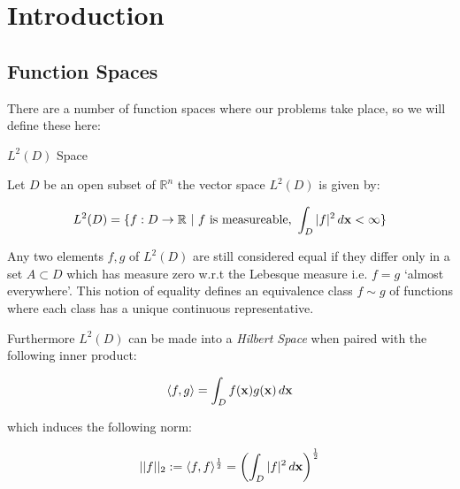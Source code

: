 \chapter{Introduction}


\section{Function Spaces}

There are a number of function spaces where our problems take place, so we will
define these here:

\begin{definition}\label{def:L2-D}
    $L^2(D)$ Space

    Let $D$ be an open subset of $\mathbb{R}^n$ the vector space $L^2(D)$ is
    given by:

    \begin{equation}\label{eq:L2-D}
        L^2(D) = \{f: D \rightarrow \mathbb{R}\ |\ f \text{ is measureable, }
                    \int_D|f|^2\, d\mathbf{x} < \infty\}
    \end{equation}

    Any two elements $f,g$ of $L^2(D)$ are still considered equal if they
    differ only in a set $A \subset D$ which has measure zero w.r.t the
    Lebesque measure i.e. $f = g$ `almost everywhere'. This notion of equality
    defines an equivalence class $f \sim g$ of functions where each class has a
    unique continuous representative.

    Furthermore $L^2(D)$ can be made into a \textit{Hilbert Space} when paired
    with the following inner product:

    \begin{equation}\label{eq:L2-D-inner-product}
        \langle f,g \rangle = \int_Df(\mathbf{x})g(\mathbf{x})\, d\mathbf{x}
    \end{equation}

    which induces the following norm:

    \begin{equation}\label{eq:L2-D-norm}
        ||f||_2 := \langle f, f\rangle^{\frac{1}{2}}
                 = \left(\int_D|f|^2\, d\mathbf{x}\right)^{\frac{1}{2}}
    \end{equation}

\end{definition}


